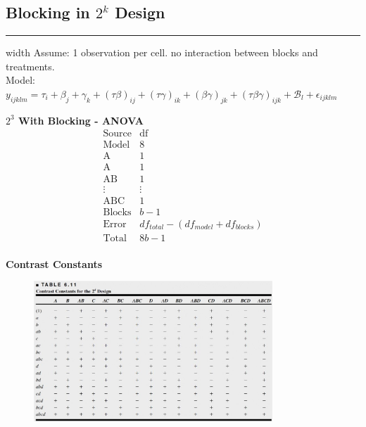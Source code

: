 \documentclass[10pt]{article}
\begin{document}
\subsection*{Blocking in $2^k$ Design}
\hrule width \textwidth
\vspace{6pt}
Assume: 1 observation per cell. no interaction between blocks and treatments. \\
Model: \\
$y_{ijklm} = \tau_i + \beta_j + \gamma_k 
           + (\tau \beta)_{ij} + (\tau \gamma)_{ik} + (\beta \gamma)_{jk}
           + (\tau \beta \gamma)_{ijk} + \mathcal{B}_l + \epsilon_{ijklm}$ \\

\begin{multicols}{2}
  \begin{flushleft}
    \textbf{$2^3$ With Blocking - ANOVA}
    \begin{equation*}
      \begin{array}{c|c}
        \text{Source} & \text{df}\\
          \hline
          \text{Model} & 8 \\
          \text{A} & 1 \\
          \text{A} & 1 \\
          \text{AB} & 1\\
          \vdots & \vdots \\
          \text{ABC} & 1\\
          \text{Blocks} & b - 1 \\
          \text{Error} & df_{total} - (df_{model} + df_{blocks})  \\
          \hline
          \text{Total} & 8b - 1 \\
      \end{array}
    \end{equation*}
  \end{flushleft}
\end{multicols}

\textbf{Contrast Constants}
\begin{figure}[h] %
  \centering
  \includegraphics[width=0.8\textwidth, height=.25\textheight]{./images/table.png}
  \label{fig:interaction}
\end{figure}
\end{document}
